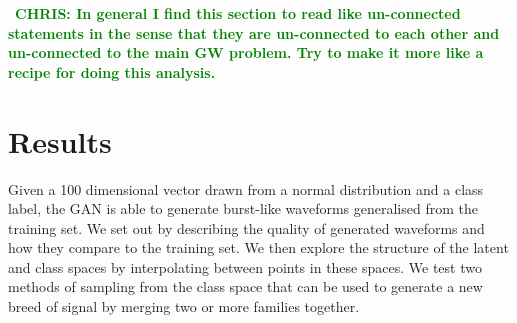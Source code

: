 \documentclass[12pt]{iopart}
\newcommand{\chris}[1]{\textbf{\textcolor{green}{CHRIS: #1}}}
\begin{document}

~\chris{In general I find this section to read like un-connected statements in
the sense that they are un-connected to each other and un-connected to the main
GW problem. Try to make it more like a recipe for doing this analysis.}

\section{Results}

Given a 100 dimensional vector drawn from a normal distribution and a class label, the GAN is able to generate burst-like waveforms  generalised from the training set. We set out by describing the quality of generated waveforms and how they compare to the training set. We then explore the structure of the latent and class spaces by interpolating between points in these spaces. We test  two methods of sampling from the class space that can be used to generate a new breed of signal by merging two or more families together.
\end{document}
